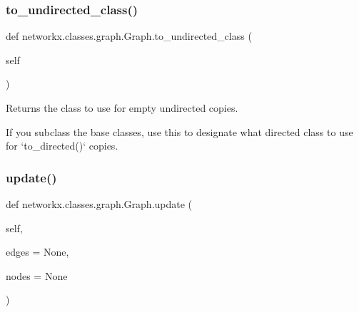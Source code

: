 \subsubsection{\texorpdfstring{to\+\_\+undirected\+\_\+class()}{to\_undirected\_class()}}
{\footnotesize\ttfamily def networkx.\+classes.\+graph.\+Graph.\+to\+\_\+undirected\+\_\+class (\begin{DoxyParamCaption}\item[{}]{self }\end{DoxyParamCaption})}

\begin{DoxyVerb}Returns the class to use for empty undirected copies.

If you subclass the base classes, use this to designate
what directed class to use for `to_directed()` copies.
\end{DoxyVerb}
 \mbox{\label{classnetworkx_1_1classes_1_1graph_1_1Graph_aaf72409cb7b39876c619d8142966e599}} 
\subsubsection{\texorpdfstring{update()}{update()}}
{\footnotesize\ttfamily def networkx.\+classes.\+graph.\+Graph.\+update (\begin{DoxyParamCaption}\item[{}]{self,  }\item[{}]{edges = {\ttfamily None},  }\item[{}]{nodes = {\ttfamily None} }\end{DoxyParamCaption})}

